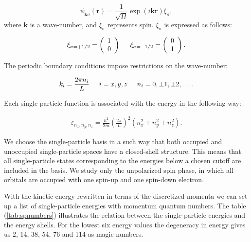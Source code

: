 \documentclass[twoside,english]{uiofysmaster}
\begin{document}
\begin{equation}
\psi_{\mathbf{k}\sigma}(\mathbf{r})= \frac{1}{\sqrt{\Omega}}\exp{(i\mathbf{kr})}\xi_{\sigma},
\end{equation}
where $\mathbf{k}$ is a wave-number, and $\xi_{\sigma}$ represents spin. $\xi_{\sigma}$ is expressed as follows:

\begin{equation}
\xi_{\sigma=+1/2}=\left(\begin{array}{c} 1 \\ 0 \end{array}\right) \hspace{0.5cm}
\xi_{\sigma=-1/2}=\left(\begin{array}{c} 0 \\ 1 \end{array}\right).
\end{equation}

The periodic boundary conditions impose restrictions on the wave-number:

\begin{equation}
k_i=\frac{2\pi n_i}{L}\hspace{0.5cm} i=x,y,z \hspace{0.5cm} n_i=0,\pm 1,\pm 2, \dots .
\end{equation}

Each single particle function is associated with the energy in the following way:

\begin{align}
  \varepsilon_{n_{x}, n_{y}, n_{z}} = \frac{\hbar^{2}}{2m}
  \left( \frac{2\pi }{L}\right)^{2}
  \left( n_{x}^{2} + n_{y}^{2} + n_{z}^{2}\right).
\end{align}

We choose the single-particle basis in a such way that both occupied and unoccupied single-particle spaces have a closed-shell structure. This means that all single-particle states corresponding to the energies below a chosen cutoff are included in the basis. We study only the unpolarized spin phase, in which all orbitals are occupied with one spin-up and one spin-down electron. 

With the kinetic energy rewritten in terms of the discretized momenta we can set up a list of
single-particle energies with momentum quantum numbers.
The table (\ref{tab:spnumbers}) illustrates the relation between the single-particle energies and the energy shells. For the lowest six energy values the degeneracy in energy gives us 2, 14, 38, 54, 76 and 114 as magic numbers. 
\end{document}

